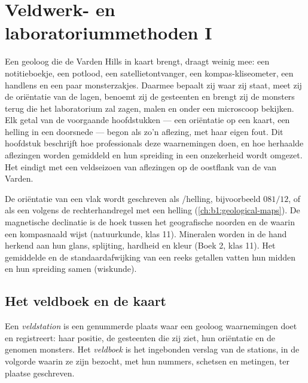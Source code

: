 \chapter{Veldwerk- en laboratoriummethoden I}\label{ch:b1:field-lab-methods-1}

Een geoloog die de Varden Hills in kaart brengt, draagt weinig mee: een notitieboekje, een potlood, een
satellietontvanger, een kompas-kliseometer, een handlens en een paar monsterzakjes. Daarmee bepaalt zij waar
zij staat, meet zij de oriëntatie van de lagen, benoemt zij de gesteenten en brengt zij de monsters terug die
het laboratorium zal zagen, malen en onder een microscoop bekijken. Elk getal van de voorgaande hoofdstukken ---
een oriëntatie op een kaart, een helling in een doorsnede --- begon als zo'n aflezing, met haar eigen fout.
Dit hoofdstuk beschrijft hoe professionals deze waarnemingen doen, en hoe herhaalde aflezingen worden gemiddeld
en hun spreiding in een onzekerheid wordt omgezet. Het eindigt met een veldseizoen van aflezingen op de oostflank
van de  van Varden.

\begin{recall}
De oriëntatie van een vlak wordt geschreven als /helling, bijvoorbeeld $081/12$, of als een 
volgens de rechterhandregel met een helling (\cref{ch:b1:geological-maps}). De magnetische declinatie is de hoek
tussen het geografische noorden en de  waarin een kompasnaald wijst (natuurkunde, klas 11). Mineralen
worden in de hand herkend aan hun glans, splijting, hardheid en kleur (Boek 2, klas 11). Het gemiddelde en de
standaardafwijking van een reeks getallen vatten hun midden en hun spreiding samen (wiskunde).
\end{recall}

\section{Het veldboek en de kaart}

\begin{definition}\label{def:b1:field-lab-methods-1:station}
Een \emph{veldstation} is een genummerde plaats waar een geoloog waarnemingen doet en
registreert: haar positie, de gesteenten die zij ziet, hun oriëntatie en de genomen monsters. Het
\emph{veldboek} is het ingebonden verslag van de stations, in de volgorde waarin ze zijn bezocht,
met hun nummers, schetsen en metingen, ter plaatse geschreven.
\end{definition}

